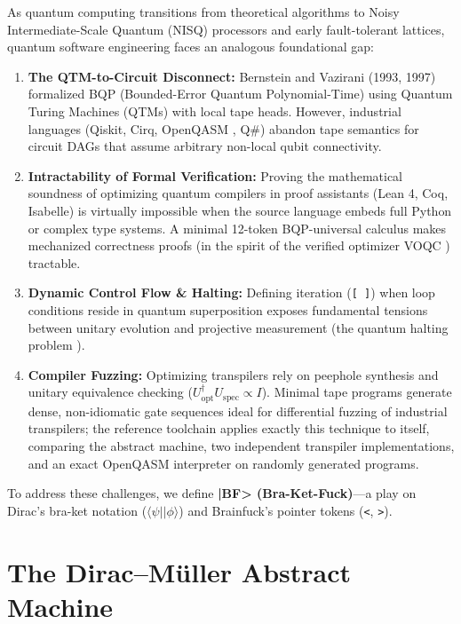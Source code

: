 \documentclass[11pt,a4paper,twocolumn]{article}
\begin{document}
As quantum computing transitions from theoretical algorithms to Noisy Intermediate-Scale Quantum (NISQ) processors \cite{preskill2018nisq} and early fault-tolerant lattices, quantum software engineering faces an analogous foundational gap:
\begin{enumerate}
    \item \textbf{The QTM-to-Circuit Disconnect:} Bernstein and Vazirani (1993, 1997) \cite{bernstein1997quantum} formalized BQP (Bounded-Error Quantum Polynomial-Time) using Quantum Turing Machines (QTMs) with local tape heads. However, industrial languages (Qiskit, Cirq, OpenQASM \cite{cross2022openqasm3}, Q\#) abandon tape semantics for circuit DAGs that assume arbitrary non-local qubit connectivity.
    \item \textbf{Intractability of Formal Verification:} Proving the mathematical soundness of optimizing quantum compilers in proof assistants (Lean 4, Coq, Isabelle) is virtually impossible when the source language embeds full Python or complex type systems. A minimal 12-token BQP-universal calculus makes mechanized correctness proofs (in the spirit of the verified optimizer VOQC \cite{rand2018voqc}) tractable.
    \item \textbf{Dynamic Control Flow \& Halting:} Defining iteration (\texttt{[ ]}) when loop conditions reside in quantum superposition exposes fundamental tensions between unitary evolution and projective measurement (the quantum halting problem \cite{ozawa1998halting,linden1998halting}).
    \item \textbf{Compiler Fuzzing:} Optimizing transpilers rely on peephole synthesis and unitary equivalence checking ($U_{\text{opt}}^\dagger U_{\text{spec}} \propto I$). Minimal tape programs generate dense, non-idiomatic gate sequences ideal for differential fuzzing of industrial transpilers; the reference toolchain applies exactly this technique to itself, comparing the abstract machine, two independent transpiler implementations, and an exact OpenQASM interpreter on randomly generated programs.
\end{enumerate}

To address these challenges, we define \textbf{|BF> (Bra-Ket-Fuck)}---a play on Dirac's bra-ket notation ($\langle\psi||\phi\rangle$) \cite{dirac1939notation} and Brainfuck's pointer tokens (\texttt{<}, \texttt{>}).

\section{The Dirac--M\"uller Abstract Machine}
\end{document}
